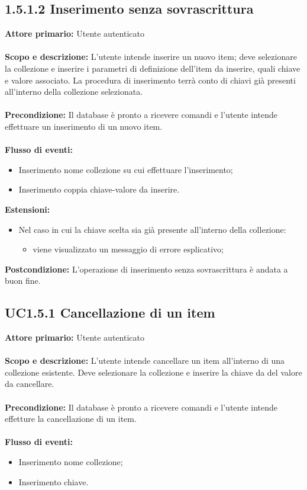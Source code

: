 \documentclass{scalatekids-article}
\begin{document}
\subsection{1.5.1.2 Inserimento senza sovrascrittura}
\textbf{Attore primario:} Utente autenticato \\ \\
\textbf{Scopo e descrizione:} L'utente intende inserire un nuovo item; deve selezionare la collezione e inserire i parametri di definizione dell'item da inserire, quali chiave e valore associato. La procedura di inserimento terrà conto di chiavi già presenti all'interno della collezione selezionata.\\ \\
\textbf{Precondizione:} Il database è pronto a ricevere comandi e l'utente intende effettuare un inserimento di un nuovo item.\\ \\
\textbf{Flusso di eventi:}
\begin{itemize}
\item Inserimento nome collezione su cui effettuare l'inserimento;
\item Inserimento coppia chiave-valore da inserire.
\end{itemize}
\textbf{Estensioni:}
\begin{itemize}
\item Nel caso in cui la chiave scelta sia già presente all'interno della collezione:
  \begin{itemize}
  \item viene visualizzato un messaggio di errore esplicativo;
  \end{itemize}
\end{itemize}
\textbf{Postcondizione:} L'operazione di inserimento senza sovrascrittura è andata a buon fine.
\subsection{UC1.5.1 Cancellazione di un item}
\textbf{Attore primario:} Utente autenticato\\ \\
\textbf{Scopo e descrizione:} L'utente intende cancellare un item all'interno di una collezione esistente. Deve selezionare la collezione e inserire la chiave da del valore da cancellare.\\ \\
\textbf{Precondizione:} Il database è pronto a ricevere comandi e l'utente intende effetture la cancellazione di un item.\\ \\
\textbf{Flusso di eventi:}
\begin{itemize}
\item Inserimento nome collezione;
\item Inserimento chiave.
\end{itemize}
\end{document}
